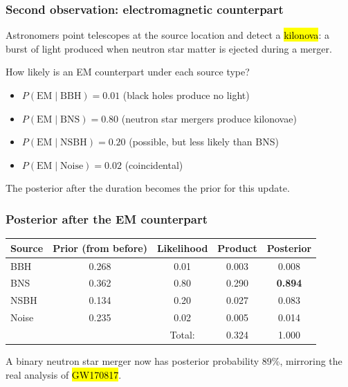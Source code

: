\documentclass[slidestop,compress,mathserif]{beamer}
\begin{document}
\begin{frame}
\frametitle{Second observation: electromagnetic counterpart}

Astronomers point telescopes at the source location and detect a \hl{kilonova}: a burst of light produced when neutron star matter is ejected during a merger.

\pause
\medskip

How likely is an EM counterpart under each source type?
\begin{itemize}
\item $P(\text{EM} \mid \text{BBH}) = 0.01$ \quad (black holes produce no light)
\item $P(\text{EM} \mid \text{BNS}) = 0.80$ \quad (neutron star mergers produce kilonovae)
\item $P(\text{EM} \mid \text{NSBH}) = 0.20$ \quad (possible, but less likely than BNS)
\item $P(\text{EM} \mid \text{Noise}) = 0.02$ \quad (coincidental)
\end{itemize}

\pause

The posterior after the duration becomes the prior for this update.

\end{frame}

\begin{frame}
\frametitle{Posterior after the EM counterpart}

\vspace{0.35em}
\renewcommand{\arraystretch}{1.15}
\begin{tabular}{l c c c c}
\toprule
Source & Prior (from before) & Likelihood & Product & Posterior \\
\midrule
BBH  & 0.268 & 0.01 & 0.003 & 0.008 \\
BNS  & 0.362 & 0.80 & 0.290 & \textbf{0.894} \\
NSBH & 0.134 & 0.20 & 0.027 & 0.083 \\
Noise & 0.235 & 0.02 & 0.005 & 0.014 \\
\midrule
& & Total:  & 0.324 & 1.000 \\
\bottomrule
\end{tabular}

\pause
\medskip

A binary neutron star merger now has posterior probability 89\%, mirroring the real analysis of \hl{GW170817}.

\end{frame}
\end{document}
